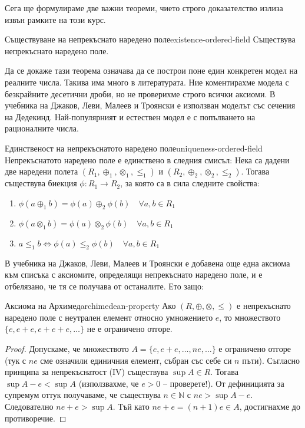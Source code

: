 Сега ще формулираме две важни теореми, чието строго доказателство излиза извън рамките на този курс.

\begin{theorem}{Съществуване на непрекъснато наредено поле}{existence-ordered-field}
Съществува непрекъснато наредено поле.
\end{theorem}

Да се докаже тази теорема означава да се построи поне един конкретен модел на реалните числа. Такива има много в литературата. Ние коментирахме модела с безкрайните десетични дроби, но не проверихме строго всички аксиоми. В учебника на Джаков, Леви, Малеев и Троянски е използван моделът със сечения на Дедекинд. Най-популярният и естествен модел е с попълването на рационалните числа.

\begin{theorem}{Единственост на непрекъснатото наредено поле}{uniqueness-ordered-field}
Непрекъснатото наредено поле е единствено в следния смисъл: Нека са дадени две наредени полета $(R_1, \oplus_1, \otimes_1, \le_1)$ и $(R_2, \oplus_2, \otimes_2, \le_2)$. Тогава съществува биекция $\phi : R_1 \to R_2$, за която са в сила следните свойства:
\begin{enumerate}
    \item $\phi(a \oplus_1 b) = \phi(a) \oplus_2 \phi(b) \quad \forall a, b \in R_1$
    \item $\phi(a \otimes_1 b) = \phi(a) \otimes_2 \phi(b) \quad \forall a, b \in R_1$
    \item $a \le_1 b \iff \phi(a) \le_2 \phi(b) \quad \forall a, b \in R_1$
\end{enumerate}
\end{theorem}

В учебника на Джаков, Леви, Малеев и Троянски е добавена още една аксиома към списъка с аксиомите, определящи непрекъснато наредено поле, и е отбелязано, че тя се получава от останалите. Ето защо:

\begin{theorem}{Аксиома на Архимед}{archimedean-property}
Ако $(R, \oplus, \otimes, \le)$ е непрекъснато наредено поле с неутрален елемент относно умножението $e$, то множеството $\{e, e + e, e + e + e, \dots\}$ не е ограничено отгоре.
\end{theorem}

\begin{proof}
Допускаме, че множеството $A = \{e, e + e, \dots, ne, \dots\}$ е ограничено отгоре (тук с $ne$ сме означили единичния елемент, събран със себе си $n$ пъти). Съгласно принципа за непрекъснатост (IV) съществува $\sup A \in R$. Тогава $\sup A - e < \sup A$ (използвахме, че $e > 0$ -- проверете!). От дефиницията за супремум оттук получаваме, че съществува $n \in \mathbb{N}$ с $ne > \sup A - e$. Следователно $ne + e > \sup A$. Тъй като $ne + e = (n + 1)e \in A$, достигнахме до противоречие.
\end{proof}

